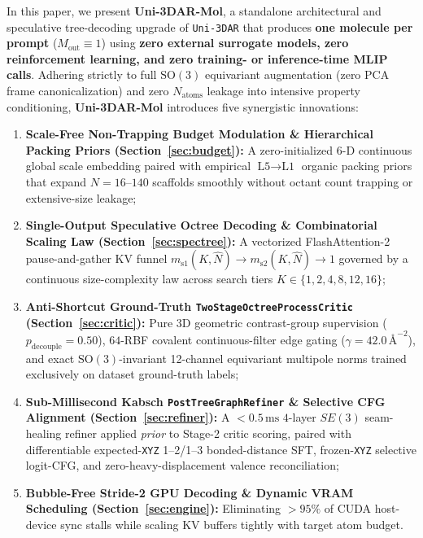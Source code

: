 \documentclass[11pt,a4paper]{article}
\begin{document}
In this paper, we present \textbf{Uni-3DAR-Mol}, a standalone architectural and speculative tree-decoding upgrade of \texttt{Uni-3DAR} that produces \textbf{one molecule per prompt} ($M_{\text{out}} \equiv 1$) using \textbf{zero external surrogate models, zero reinforcement learning, and zero training- or inference-time MLIP calls}. Adhering strictly to full $\text{SO}(3)$ equivariant augmentation (zero PCA frame canonicalization) and zero $N_{\text{atoms}}$ leakage into intensive property conditioning, \textbf{Uni-3DAR-Mol} introduces five synergistic innovations:
\begin{enumerate}[leftmargin=1.6em,itemsep=1pt,topsep=2pt]
    \item \textbf{Scale-Free Non-Trapping Budget Modulation \& Hierarchical Packing Priors (Section~\ref{sec:budget}):} A zero-initialized 6-D continuous global scale embedding paired with empirical $\text{L5}\to\text{L1}$ organic packing priors that expand $N=16\text{--}140$ scaffolds smoothly without octant count trapping or extensive-size leakage;
    \item \textbf{Single-Output Speculative Octree Decoding \& Combinatorial Scaling Law (Section~\ref{sec:spectree}):} A vectorized FlashAttention-2 \citep{dao2023flashattention2} pause-and-gather KV funnel $m_{\text{s1}}(K,\hat{N}) \to m_{\text{s2}}(K,\hat{N}) \to 1$ governed by a continuous size-complexity law across search tiers $K \in \{1, 2, 4, 8, 12, 16\}$;
    \item \textbf{Anti-Shortcut Ground-Truth \texttt{TwoStage\allowbreak Octree\allowbreak ProcessCritic} (Section~\ref{sec:critic}):} Pure 3D geometric contrast-group supervision ($p_{\text{decouple}}=0.50$), $64$-RBF covalent continuous-filter edge gating ($\gamma=42.0\,\text{\AA}^{-2}$), and exact $\text{SO}(3)$-invariant 12-channel equivariant multipole norms trained exclusively on dataset ground-truth labels;
    \item \textbf{Sub-Millisecond Kabsch \texttt{PostTree\allowbreak Graph\allowbreak Refiner} \& Selective CFG Alignment (Section~\ref{sec:refiner}):} A $<0.5\,\text{ms}$ $4$-layer $SE(3)$ seam-healing refiner applied \emph{prior} to Stage-2 critic scoring, paired with differentiable expected-\texttt{XYZ} 1--2/1--3 bonded-distance SFT, frozen-\texttt{XYZ} selective logit-CFG, and zero-heavy-displacement valence reconciliation;
    \item \textbf{Bubble-Free Stride-2 GPU Decoding \& Dynamic VRAM Scheduling (Section~\ref{sec:engine}):} Eliminating $>95\%$ of CUDA host-device sync stalls while scaling KV buffers tightly with target atom budget.
\end{enumerate}
\end{document}
